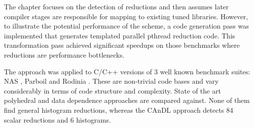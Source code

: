     The chapter focuses on the detection of reductions and then assumes later
    compiler stages are responsible for mapping to existing tuned libraries.
    However, to illustrate the potential performance of the scheme, a code
    generation pass was implemented that generates templated parallel pthread
    reduction code.
    This transformation pass achieved significant speedups on those benchmarks
    where reductions are performance bottlenecks.

    The approach was applied to C/C++ versions of 3 well known benchmark
    suites:
    NAS \cite{seo2011performance},
    Parboil \cite{stratton2012parboil} and
    Rodinia \cite{Che2009Rodinia}.
    These are non-trivial code bases and vary considerably in terms of code
    structure and complexity.
    State of the art polyhedral and data dependence approaches are compared
    against.
    None of them find general histogram reductions, whereas the CAnDL approach
    detects 84 scalar reductions and 6 histograms.

%
%

